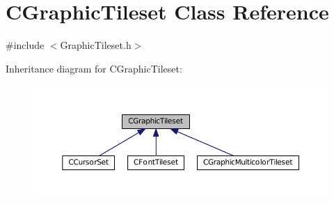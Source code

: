 \hypertarget{classCGraphicTileset}{}\section{C\+Graphic\+Tileset Class Reference}
\label{classCGraphicTileset}


{\ttfamily \#include $<$Graphic\+Tileset.\+h$>$}



Inheritance diagram for C\+Graphic\+Tileset\+:
\nopagebreak
\begin{figure}[H]
\begin{center}
\leavevmode
\includegraphics[width=350pt]{classCGraphicTileset__inherit__graph}
\end{center}
\end{figure}
